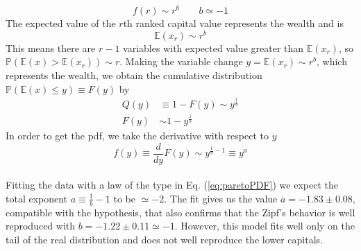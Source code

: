 \begin{equation}
    f(r) \sim r^b \ \ \ \ \ \ \ \ \ b \simeq -1
    \label{eq:zipf}
\end{equation}
The expected value of the $r$th ranked capital value represents the wealth and is
\begin{equation*}
    \mathbb{E}(x_r)\sim r^b
\end{equation*}
This means there are $r - 1$ variables with expected value greater than $\mathbb{E}(x_r)$, so $\mathbb{P}\left(\mathbb{E}(x) > \mathbb{E}(x_r)\right) \sim r$.
Making the variable change $y = \mathbb{E}(x_r) \sim r^b$, which represents the wealth, we obtain the cumulative distribution $\mathbb{P}\left(\mathbb{E}(x) \leq y\right) \equiv F(y)$ by
\begin{equation*}
    \begin{split}
        Q(y) &\equiv 1 - F(y) \sim y^{\frac{1}{b}} \\
        F(y) &\sim 1 - y^{\frac{1}{b}}
    \end{split}
\end{equation*}
In order to get the pdf, we take the derivative with respect to $y$
\begin{equation}
    f(y) \equiv \frac{d}{dy}F(y) \sim y^{\frac{1}{b} - 1} \equiv y^a
    \label{eq:paretoPDF}
\end{equation}
\\Fitting the data with a law of the type in Eq. (\ref{eq:paretoPDF}) we expect the total exponent $a \equiv \frac{1}{b} - 1$ to be $\simeq -2$.
The fit gives us the value $a = -1.83 \pm 0.08$, compatible with the hypothesis, that also confirms that the Zipf's behavior is well reproduced with $b = -1.22 \pm 0.11 \simeq -1$.
However, this model fits well only on the tail of the real distribution and does not well reproduce the lower capitals. \\ \\
